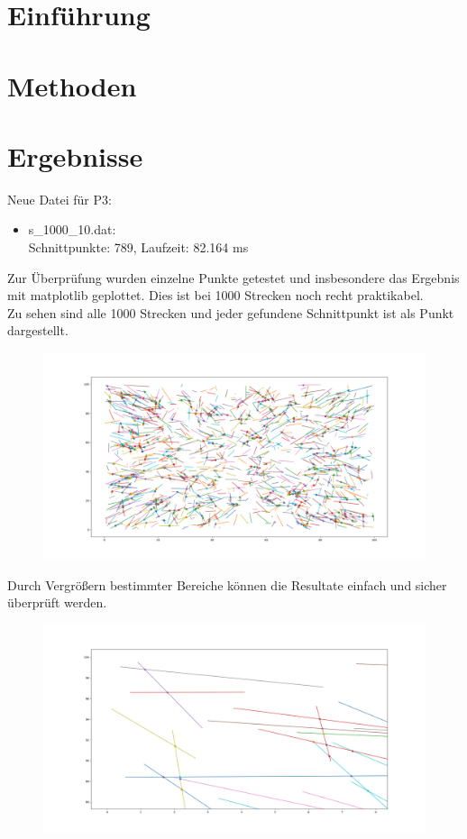 \documentclass[12pt]{scrartcl}
\begin{document}
\section{Einführung}


\section{Methoden}


\section{Ergebnisse}

Neue Datei für P3: 
\begin{itemize}
    \item s\_1000\_10.dat: \\Schnittpunkte: 789, Laufzeit: 82.164 ms
\end{itemize}

Zur Überprüfung wurden einzelne Punkte getestet und insbesondere das Ergebnis mit matplotlib geplottet. Dies ist bei 1000 Strecken noch recht praktikabel.\\
Zu sehen sind alle 1000 Strecken und jeder gefundene Schnittpunkt ist als Punkt dargestellt.\\
\begin{figure}[ht]
    \advance\leftskip-4cm
    \includegraphics[scale=0.48]{Plot_all.png}
\end{figure}

Durch Vergrößern bestimmter Bereiche können die Resultate einfach und sicher überprüft werden.\\
\begin{figure}[ht]
    \advance\leftskip-4cm
    \includegraphics[scale=0.48]{Plot_zoom.png}
\end{figure}
\end{document}
